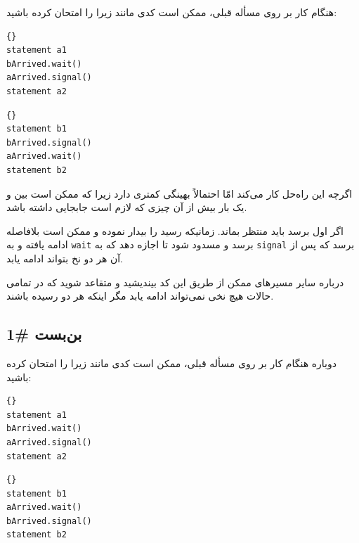 \documentclass{book}
\begin{document}
    هنگام کار بر روی مسأله قبلی، ممکن است کدی مانند زیرا را امتحان کرده باشید:

\begin{latin}
\begin{minipage}[t]{2in}
\begin{latin}
\begin{lstlisting}[title=\rl{نخ \lr{A}}]{}
statement a1
bArrived.wait()
aArrived.signal()
statement a2
\end{lstlisting}
\end{latin}
\end{minipage}
\hfill
\begin{minipage}[t]{2in}
\begin{latin}
\begin{lstlisting}[title=\rl{نخ \lr{B}}]{}
statement b1
bArrived.signal()
aArrived.wait()
statement b2
\end{lstlisting}
\end{latin}
\end{minipage}
\end{latin}

    اگرچه این راه‌حل کار می‌کند امّا احتمالاً  بهینگی کمتری دارد زیرا که ممکن است بین   و  یک بار بیش از آن چیزی که لازم است 
    جابجایی داشته باشد. 

    اگر اول     برسد باید منتظر    بماند. زمانیکه     رسید      را بیدار نموده و ممکن است بلافاصله 
    ادامه یافته و به   \texttt{wait} برسد و مسدود شود تا اجازه دهد که      به  \texttt{signal} برسد که پس از آن 
    هر دو نخ بتواند ادامه یابد. 

    درباره سایر مسیرهای ممکن از طریق این کد بیندیشید و متقاعد شوید که در تمامی حالات هیچ نخی نمی‌تواند ادامه یابد مگر اینکه هر دو رسیده باشند. 

\subsection {بن‌بست \#1}

      دوباره هنگام کار بر روی مسأله قبلی، ممکن است کدی مانند زیرا را امتحان کرده باشید:

\begin{latin}
\begin{minipage}[t]{2in}
\begin{latin}
\begin{lstlisting}[title=\rl{نخ \lr{A}}]{}
statement a1
bArrived.wait()
aArrived.signal()
statement a2
\end{lstlisting}
\end{latin}
\end{minipage}
\hfill
\begin{minipage}[t]{2in}
\begin{latin}
\begin{lstlisting}[title=\rl{نخ \lr{B}}]{}
statement b1
aArrived.wait()
bArrived.signal()
statement b2
\end{lstlisting}
\end{latin}
\end{minipage}
\end{latin}
\end{document}
